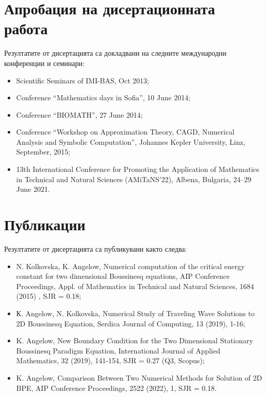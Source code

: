 \documentclass[a5paper]{article}
\theoremstyle{remark}
\begin{document}
\begin{normalsize}
\section{Апробация на дисертационната работа}\label{approb}

Резултатите от дисертацията са докладвани на следните международни конференции и семинари:
\begin{itemize}
\item Scientific Seminars of IMI-BAS, Oct 2013;

\item Conference ``Mathematics days in Sofia'', 10 June 2014;

\item Conference ``BIOMATH'', 27 June 2014;

\item Conference ``Workshop on Approximation Theory, CAGD, Numerical Analysis and Symbolic Computation'',  Johannes Kepler University, Linz, September, 2015;

\item 13th International Conference for Promoting the Application of Mathematics in Technical and Natural Sciences (AMiTaNS’22), Albena, Bulgaria, 24–29 June 2021. 
\end{itemize}

\section{Публикации}\label{approb}

Резултатите от дисертацията са публикувани както следва:
\begin{itemize}
\item N. Kolkovska, K. Angelow, Numerical computation of the critical energy constant for two dimensional Boussinesq equations, AIP Conference Proceedings, Appl. of Mathematics in Technical and Natural Sciences, 1684 (2015) , SJR = 0.18;

\item К. Angelow, N. Kolkovska, Numerical Study of Traveling Wave Solutions to 2D Boussinesq Equation, Serdica Journal of Computing, 13 (2019), 1-16;

\item K. Angelow, New Boundary Condition for the Two Dimensional Stationary Boussinesq Paradigm Equation, International Journal of Applied Mathematics, 32 (2019), 141-154, SJR = 0.27 (Q3, Scopus);

\item K. Angelow, Comparison Between Two Numerical Methods for Solution of 2D BPE, AIP Conference Proceedings, 2522 (2022), 1, SJR = 0.18.
\end{itemize}


\end{normalsize}
\end{document}
